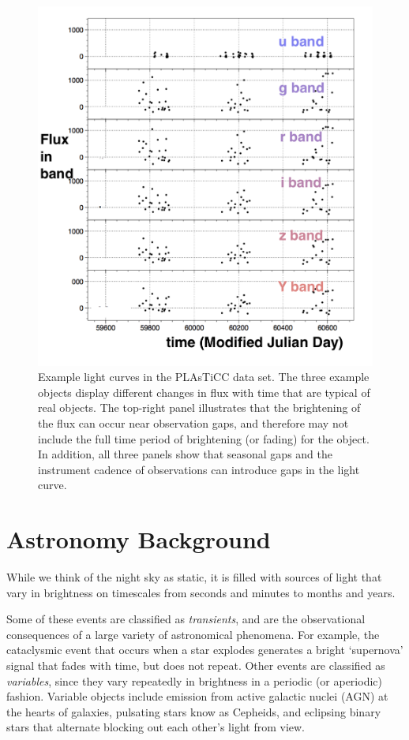 \begin{figure}[htbp!]
\begin{center}
\includegraphics[scale=0.4]{figures/lcplot_model80.png}
\caption{Example light curves in the PLAsTiCC data set. The three example objects display different changes in flux with time that are typical of real objects. The top-right panel  illustrates that the brightening of the flux can occur near observation gaps, and therefore may not include the full time period of brightening (or fading) for the object. In addition, all three panels show that seasonal gaps and the instrument cadence of observations can introduce gaps in the light curve.\label{fig:lc}}
\end{center}
\end{figure}



\section{Astronomy Background}
While we think of the night sky as static, it is filled with sources of light that vary in brightness on timescales from seconds and minutes to months and years. 

Some of these events are classified as   \textit{transients}, and are the
observational consequences of a large variety of astronomical phenomena. 
For example, the cataclysmic event that occurs when a star explodes generates a 
bright `supernova' signal that fades with time, but does not repeat.
Other events are classified as \textit{variables}, since they vary repeatedly in brightness in a periodic 
(or aperiodic) fashion.
Variable objects include emission from active galactic nuclei (AGN) at the hearts of galaxies, 
pulsating stars know as Cepheids,
and eclipsing binary stars that alternate blocking out each other's light from view.


